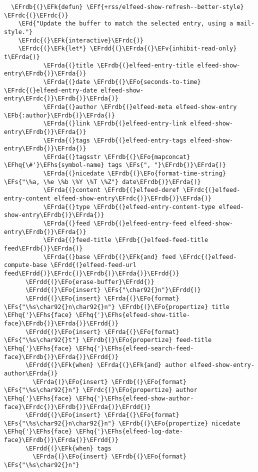 \documentclass[c]{article}
\theoremstyle{plain}%
\theoremstyle{definition}
\theoremstyle{remark}
\newcommand{\EFs}[1]{\textcolor{EFs}{#1}} %
\newcommand{\EFd}[1]{\textcolor{EFd}{#1}} %
\newcommand{\EFk}[1]{\textcolor{EFk}{#1}} %
\newcommand{\EFb}[1]{\textcolor{EFb}{#1}} %
\newcommand{\EFf}[1]{\textcolor{EFf}{#1}} %
\newcommand{\EFv}[1]{\textcolor{EFv}{#1}} %
\newcommand{\EFo}[1]{\textcolor{EFo}{#1}} %
\newcommand{\EFhq}[1]{\textcolor{EFhq}{#1}} %
\newcommand{\EFhs}[1]{\textcolor{EFhs}{#1}} %
\newcommand{\EFrda}[1]{\textcolor{EFrda}{#1}} %
\newcommand{\EFrdb}[1]{\textcolor{EFrdb}{#1}} %
\newcommand{\EFrdc}[1]{\textcolor{EFrdc}{#1}} %
\newcommand{\EFrdd}[1]{\textcolor{EFrdd}{#1}} %
\begin{document}
\begin{Code}
\begin{Verbatim}
  \EFrdb{(}\EFk{defun} \EFf{+rss/elfeed-show-refresh--better-style} \EFrdc{(}\EFrdc{)}
    \EFd{"Update the buffer to match the selected entry, using a mail-style."}
    \EFrdc{(}\EFk{interactive}\EFrdc{)}
    \EFrdc{(}\EFk{let*} \EFrdd{(}\EFrda{(}\EFv{inhibit-read-only} t\EFrda{)}
           \EFrda{(}title \EFrdb{(}elfeed-entry-title elfeed-show-entry\EFrdb{)}\EFrda{)}
           \EFrda{(}date \EFrdb{(}\EFo{seconds-to-time} \EFrdc{(}elfeed-entry-date elfeed-show-entry\EFrdc{)}\EFrdb{)}\EFrda{)}
           \EFrda{(}author \EFrdb{(}elfeed-meta elfeed-show-entry \EFb{:author}\EFrdb{)}\EFrda{)}
           \EFrda{(}link \EFrdb{(}elfeed-entry-link elfeed-show-entry\EFrdb{)}\EFrda{)}
           \EFrda{(}tags \EFrdb{(}elfeed-entry-tags elfeed-show-entry\EFrdb{)}\EFrda{)}
           \EFrda{(}tagsstr \EFrdb{(}\EFo{mapconcat} \EFhq{\#'}\EFhs{symbol-name} tags \EFs{", "}\EFrdb{)}\EFrda{)}
           \EFrda{(}nicedate \EFrdb{(}\EFo{format-time-string} \EFs{"\%a, \%e \%b \%Y \%T \%Z"} date\EFrdb{)}\EFrda{)}
           \EFrda{(}content \EFrdb{(}elfeed-deref \EFrdc{(}elfeed-entry-content elfeed-show-entry\EFrdc{)}\EFrdb{)}\EFrda{)}
           \EFrda{(}type \EFrdb{(}elfeed-entry-content-type elfeed-show-entry\EFrdb{)}\EFrda{)}
           \EFrda{(}feed \EFrdb{(}elfeed-entry-feed elfeed-show-entry\EFrdb{)}\EFrda{)}
           \EFrda{(}feed-title \EFrdb{(}elfeed-feed-title feed\EFrdb{)}\EFrda{)}
           \EFrda{(}base \EFrdb{(}\EFk{and} feed \EFrdc{(}elfeed-compute-base \EFrdd{(}elfeed-feed-url feed\EFrdd{)}\EFrdc{)}\EFrdb{)}\EFrda{)}\EFrdd{)}
      \EFrdd{(}\EFo{erase-buffer}\EFrdd{)}
      \EFrdd{(}\EFo{insert} \EFs{"\char92{}n"}\EFrdd{)}
      \EFrdd{(}\EFo{insert} \EFrda{(}\EFo{format} \EFs{"\%s\char92{}n\char92{}n"} \EFrdb{(}\EFo{propertize} title \EFhq{'}\EFhs{face} \EFhq{'}\EFhs{elfeed-show-title-face}\EFrdb{)}\EFrda{)}\EFrdd{)}
      \EFrdd{(}\EFo{insert} \EFrda{(}\EFo{format} \EFs{"\%s\char92{}t"} \EFrdb{(}\EFo{propertize} feed-title \EFhq{'}\EFhs{face} \EFhq{'}\EFhs{elfeed-search-feed-face}\EFrdb{)}\EFrda{)}\EFrdd{)}
      \EFrdd{(}\EFk{when} \EFrda{(}\EFk{and} author elfeed-show-entry-author\EFrda{)}
        \EFrda{(}\EFo{insert} \EFrdb{(}\EFo{format} \EFs{"\%s\char92{}n"} \EFrdc{(}\EFo{propertize} author \EFhq{'}\EFhs{face} \EFhq{'}\EFhs{elfeed-show-author-face}\EFrdc{)}\EFrdb{)}\EFrda{)}\EFrdd{)}
      \EFrdd{(}\EFo{insert} \EFrda{(}\EFo{format} \EFs{"\%s\char92{}n\char92{}n"} \EFrdb{(}\EFo{propertize} nicedate \EFhq{'}\EFhs{face} \EFhq{'}\EFhs{elfeed-log-date-face}\EFrdb{)}\EFrda{)}\EFrdd{)}
      \EFrdd{(}\EFk{when} tags
        \EFrda{(}\EFo{insert} \EFrdb{(}\EFo{format} \EFs{"\%s\char92{}n"}

\end{Verbatim}
\end{Code}
\end{document}
